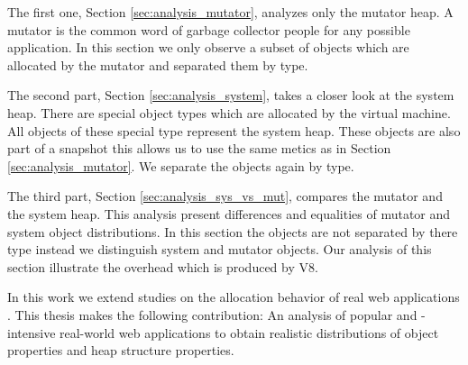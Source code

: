 The first one, Section \ref{sec:analysis_mutator}, analyzes only the mutator
heap. A mutator is the common word of garbage collector people for any possible
application. In this section we only observe a subset of objects which are
allocated by the mutator and separated them by type.

The second part, Section \ref{sec:analysis_system}, takes a closer look at the
system heap. There are special object types which are allocated by the virtual
machine. All objects of these special type represent the system heap. These
objects are also part of a snapshot this allows us to use the same metics as in
Section \ref{sec:analysis_mutator}. We separate the objects again by type.

The third part, Section \ref{sec:analysis_sys_vs_mut}, compares the mutator and
the system heap. This analysis present differences and equalities of mutator
and system object distributions. In this section the objects are not separated
by there type instead we distinguish system and mutator objects. Our analysis
of this section illustrate the overhead which is produced by V8.

In this work we extend studies on the allocation behavior of real \JS web
applications \cite{JSMeter2009}. This thesis makes the following contribution:
An analysis of popular and \JS-intensive real-world web applications to obtain
realistic distributions of object properties and heap structure properties.
